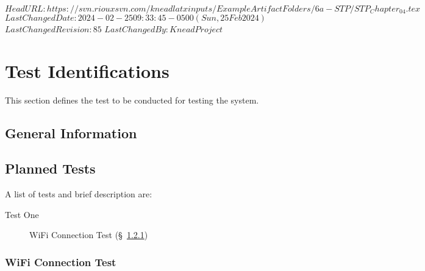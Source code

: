 \svnidlong
{$HeadURL: https://svn.riouxsvn.com/kneadlatxinputs/ExampleArtifactFolders/6a-STP/STP_Chapter_04.tex $}
{$LastChangedDate: 2024-02-25 09:33:45 -0500 (Sun, 25 Feb 2024) $}
{$LastChangedRevision: 85 $}
{$LastChangedBy: KneadProject $}


\chapter{Test Identifications}
\label{loc:TestIdentifications}
% 

This section defines the test to be conducted for testing the system.

\section{General Information}
\label{loc:TestGeneralInformation}



\section{Planned Tests}
\label{loc:TestGeneralInformation}


A list of tests and brief description are:
\begin{description}
\item [Test One] WiFi Connection Test (\S~\ref{loc:TestIdOne})
\end{description}

\subsection{WiFi Connection Test}
\label{loc:TestIdOne}
\newcommand{\TestIdName}{WiFi Test}%


% 

